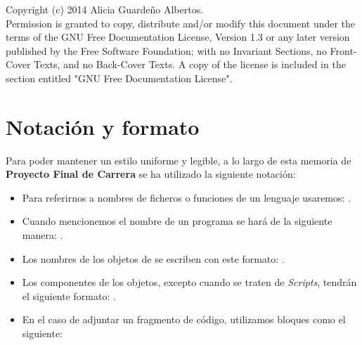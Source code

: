 Copyright (c) 2014 Alicia Guardeño Albertos.\\

Permission is granted to copy, distribute and/or modify this document under the
terms of the GNU Free Documentation License, Version 1.3 or any later version
published by the Free Software Foundation; with no Invariant Sections, no
Front-Cover Texts, and no Back-Cover Texts. A copy of the license is included in
the section entitled "GNU Free Documentation License".\\

\cleardoublepage

\section*{Notación y formato}
Para poder mantener un estilo uniforme y legible, a lo largo de esta memoria de \textbf{Proyecto Final de Carrera} se ha utilizado la siguiente notación:
\begin{itemize}
\item Para referirnos a nombres de ficheros o funciones de un lenguaje usaremos: .
\item Cuando mencionemos el nombre de un programa se hará de la siguiente manera: .
\item Los nombres de los objetos de  se escriben con este formato: .
\item Los componentes de los objetos, excepto cuando se traten de \emph{Scripts}, tendrán el siguiente formato: .
\item En el caso de adjuntar un fragmento de código, utilizamos bloques como el siguiente:
\end{itemize}

